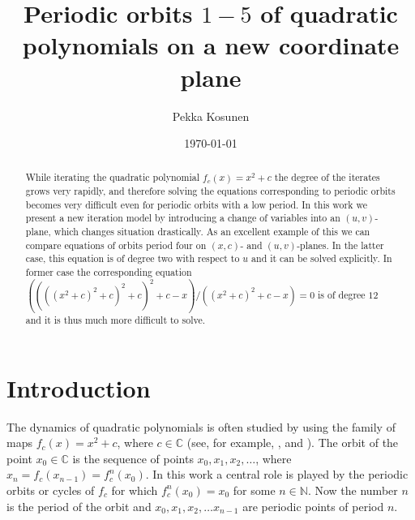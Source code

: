 \documentclass[12pt,a4paper]{amsart}
\numberwithin{equation}{section}
\numberwithin{lause}{section}
\begin{document}
\thispagestyle{empty}





\title{Periodic orbits $1-5$ of quadratic polynomials on a new coordinate plane}

\author{Pekka Kosunen}





\date{\today}




\maketitle

\noindent
\address{Department of Physics and Mathematics, University of Eastern Finland, P. O. Box 111, FI-80101 Joensuu, Finland;}



\begin{abstract}
While iterating the quadratic polynomial $f_{c}(x)=x^{2}+c$ the degree of the iterates grows very rapidly, and therefore solving the equations corresponding to periodic orbits becomes very difficult even for periodic orbits with a low period. In this work we present a new iteration model by introducing a change of variables into an $(u,v)$-plane, which changes situation drastically. As an excellent example of this we can compare equations of orbits period four on  $(x,c)$- and $(u,v)$-planes. In the latter case, this equation is of degree two with respect to $u$ and it can be solved explicitly. In former case the corresponding equation $((((x^{2}+c)^{2}+c)^{2}+c)^{2}+c-x)/((x^{2}+c)^{2}+c-x)=0$ is of degree $12$ and it is thus much more difficult to solve.
\end{abstract}













\section{Introduction}




The dynamics of quadratic polynomials is often studied by using the family of maps  $f_{c}(x)=x^{2}+c$, where $c\in \mathbb{C}$ (see, for example, \cite{4}, \cite{14} and \cite{25}). The orbit of the point $x_{0}\in \mathbb{C}$ is the sequence of points
$x_{0},x_{1},x_{2},\ldots$, where $x_{n}=f_{c}(x_{n-1})=f_{c}^{n}(x_{0})$.
In this work a central role is played by the periodic orbits or cycles of $f_{c}$ for which $f_{c}^{n}(x_{0})=x_{0}$ for some $n\in\mathbb{N}$. Now the number $n$ is the period of the orbit and $x_{0},x_{1},x_{2},\ldots x_{n-1}$ are periodic points of period $n$.
\end{document}

